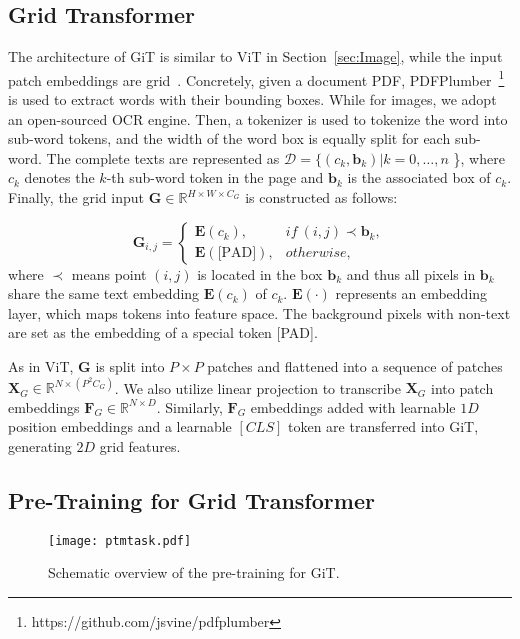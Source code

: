 \documentclass[10pt,twocolumn,letterpaper]{article}
\begin{document}
\subsection{Grid Transformer}
The architecture of GiT is similar to ViT in Section~\ref{sec:Image},
while the input patch embeddings are grid~\cite{katti2018chargrid,denk2019bertgrid}.
Concretely, given a document PDF, PDFPlumber~\footnote{https://github.com/jsvine/pdfplumber} is used to extract words with their bounding boxes.
While for images, we adopt an open-sourced OCR engine.
Then, a tokenizer is used to tokenize the word into sub-word tokens, 
and the width of the word box is equally split for each sub-word.
The complete texts are represented as $\mathcal{D}= \{(c_k, \mathbf{b}_k) | k = 0,\dots,n$ \}, where $c_k$ denotes the $k$-th sub-word token in the page and $\mathbf{b}_k$ is the associated box of $c_k$. 
Finally, the grid input $\mathbf{G} \in \mathbb{R}^{H \times W \times C_{G}} $ is constructed as follows:

\begin{equation}
\mathbf{G}_{i,j}=
\begin{cases}
\mathbf{E}(c_k), & if \: (i,j) \prec \mathbf{b}_k, \\
\mathbf{E}(\text{[PAD]}), & otherwise,
\end{cases}
\end{equation}
where $\prec $ means point $(i,j)$ is located in the box $\mathbf{b}_k$ 
and thus all pixels in $\mathbf{b}_k$ share the same text embedding $\mathbf{E}(c_k)$ of $c_k$.
$\mathbf{E}(\cdot)$ represents an embedding layer, which maps tokens into feature space.
The background pixels with non-text are set as the embedding of a special token [PAD].

As in ViT, $\mathbf{G} $ is split into $P \times P$  patches 
and flattened into a sequence of patches $ \mathbf{X}_G \in  \mathbb{R}^{N \times (P^2 C_{G})} $.
We also utilize linear projection to transcribe  $ \mathbf{X}_G$ into patch embeddings $ \mathbf{F}_G \in  \mathbb{R}^{N \times D} $.
Similarly, $\mathbf{F}_G$ embeddings added with learnable $1D$ position embeddings and a learnable $[CLS]$ token 
are transferred into GiT, generating $2D$ grid features.

\subsection{Pre-Training for Grid Transformer}

\begin{figure}[t]\centering
\texttt{[image: ptmtask.pdf]}
\caption{Schematic overview of the pre-training for GiT.}
 \label{fig:ptm}
\vspace{-2mm}
\end{figure}
\end{document}
